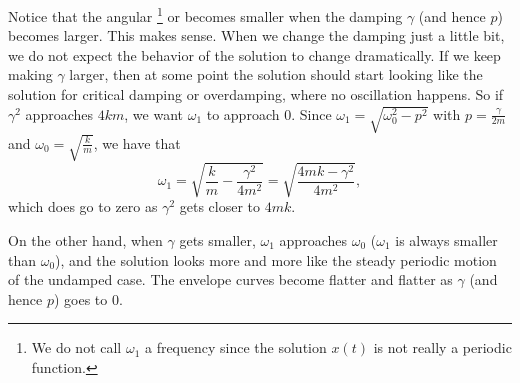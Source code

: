 \documentclass{ximera}
\begin{document}
Notice that the angular \emph{}\footnote{We do not call $\omega_1$ a frequency since the solution $x(t)$ is not really a periodic function.} or \emph{} becomes smaller when the damping $\gamma$ (and hence $p$) becomes larger.  This makes sense. When we change the damping just a little bit, we do not expect the behavior of the solution to change dramatically. If we keep making $\gamma$ larger, then at some point the solution should start looking like the solution for critical damping or overdamping, where no oscillation happens.  So if $\gamma^2$ approaches $4km$, we want $\omega_1$ to approach 0. Since $\omega_1 = \sqrt{\omega_0^2 - p^2}$ with $p = \frac{\gamma}{2m}$ and $\omega_0 = \sqrt{\frac{k}{m}}$, we have that
\begin{equation*}
    \omega_1 = \sqrt{\frac{k}{m} - \frac{\gamma^2}{4m^2}} = \sqrt{\frac{4mk - \gamma^2}{4m^2}},
\end{equation*}
which does go to zero as $\gamma^2$ gets closer to $4mk$. 


On the other hand, when $\gamma$ gets smaller, $\omega_1$ approaches $\omega_0$ ($\omega_1$ is always smaller than $\omega_0$), and the solution looks more and more like the steady periodic motion of the undamped case.  The envelope curves become flatter and flatter as $\gamma$ (and hence $p$) goes to 0.
\end{document}
